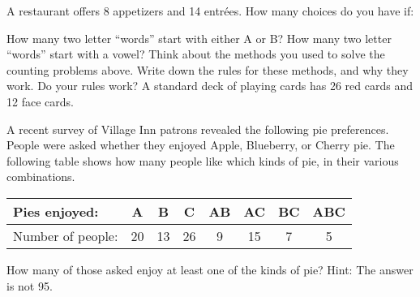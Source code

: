 \documentclass[11pt]{exam}
\begin{document}

\begin{questions}
\question A restaurant offers 8 appetizers and 14 entr\'ees.  How many choices do you have if:
\question How many two letter ``words'' start with either A or B?
\vfill
\question How many two letter ``words'' start with a vowel?
\vfill
\question Think about the methods you used to solve the counting problems above.  Write down the rules for these methods, and why they work.
\vfill
\vfill
\vfill
\vfill
\newpage
\question Do your rules work?  A standard deck of playing cards has 26 red cards and 12 face cards.


\question   A recent survey of Village Inn patrons revealed the following pie preferences.  People were asked whether they enjoyed Apple, Blueberry, or Cherry pie.
  The following table shows how many people like which kinds of pie, in their various combinations.
\begin{center}
\begin{tabular}{|l|c|c|c|c|c|c|c|}
\hline
 Pies enjoyed: & A & B & C & AB & AC & BC & ABC\\
\hline
Number of people: & 20 & 13 & 26 & 9 & 15 & 7 & 5\\
\hline
\end{tabular}
\end{center}

How many of those asked enjoy at least one of the kinds of pie?
\vfill
Hint: The answer is not 95.
\end{questions}
\end{document}
